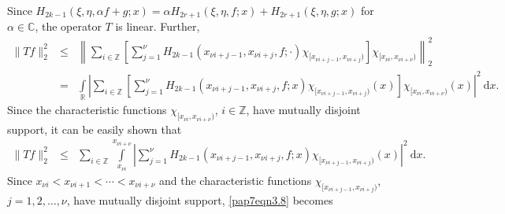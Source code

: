 \documentclass[a4paper,12pt,reqno]{amsart}
\theoremstyle{plain}
\numberwithin{equation}{section}
\theoremstyle{definition}
\newcounter {own}
\newcommand{\ds}{\displaystyle}
\begin{document}
Since $H_{2k-1}(\xi,\eta,\alpha f+g;x)=\alpha H_{2r+1}(\xi,\eta,f;x)+H_{2r+1}(\xi,\eta,g;x)$ for $\alpha\in\mathbb{C}$, the operator $T$ is linear.
Further,  
\begin{eqnarray}
\|T f\|_2^2
&\leq&\left\|\sum\limits_{i\in\mathbb{Z}}\left[\sum\limits_{j=1}^{\nu}H_{2k-1}(x_{\nu i+j-1},x_{\nu i+j},f;\cdot)\chi_{[x_{\nu i+j-1},x_{\nu i+j})}\right]\chi_{[x_{\nu i},x_{\nu i+\nu})}\right\|_2^2\nonumber\\
&=&\ds\int\limits_{\mathbb{R}}\left|\sum\limits_{i\in\mathbb{Z}}\left[\sum\limits_{j=1}^{\nu}H_{2k-1}(x_{\nu i+j-1},x_{\nu i+j},f;x)\chi_{[x_{\nu i+j-1},x_{\nu i+j})}(x)\right]\chi_{[x_{\nu i},x_{\nu i+\nu})}(x)\right|^2~\mathrm{d}x.\nonumber
\end{eqnarray}
Since the characteristic functions $\chi_{[x_{\nu i},x_{\nu i+\nu})}$, $i\in\mathbb{Z}$, have mutually disjoint support, it can be easily shown that
\begin{eqnarray}\label{pap7eqn3.8}
\|T f\|_2^2
&\leq&\ds\sum\limits_{i\in\mathbb{Z}}\int\limits_{x_{\nu i}}^{x_{\nu i+\nu}}\left|\sum\limits_{j=1}^{\nu}H_{2k-1}(x_{\nu i+j-1},x_{\nu i+j},f;x)\chi_{[x_{\nu i+j-1},x_{\nu i+j})}(x)\right|^2~\mathrm{d}x.
\end{eqnarray}
Since $x_{\nu i}<x_{\nu i+1}<\cdots<x_{\nu  i+\nu}$ and the characteristic functions $\chi_{[x_{\nu i+j-1},x_{\nu i+j})}$, $j=1,2,\dots,\nu$, have mutually disjoint support, \eqref{pap7eqn3.8} becomes
\end{document}
